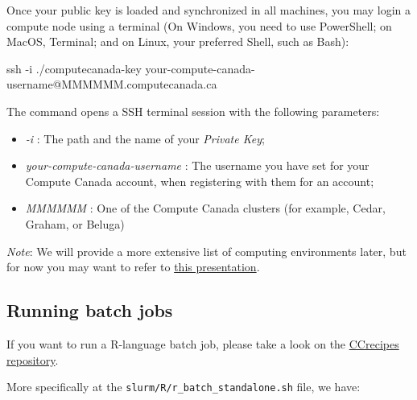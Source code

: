 \documentclass[
]{book}
\newenvironment{Shaded}{\begin{snugshade}}{\end{snugshade}}
\newcommand{\AttributeTok}[1]{\textcolor[rgb]{0.77,0.63,0.00}{#1}}
\newcommand{\FunctionTok}[1]{\textcolor[rgb]{0.00,0.00,0.00}{#1}}
\newcommand{\NormalTok}[1]{#1}
\providecommand{\tightlist}{%
  \setlength{\itemsep}{0pt}\setlength{\parskip}{0pt}}
\begin{document}
Once your public key is loaded and synchronized in all machines, you may login a compute node using a terminal (On Windows, you need to use PowerShell; on MacOS, Terminal; and on Linux, your preferred Shell, such as Bash):

\begin{Shaded}
\begin{Highlighting}[]
\FunctionTok{ssh} \AttributeTok{{-}i}\NormalTok{ ./computecanada{-}key your{-}compute{-}canada{-}username@MMMMMM.computecanada.ca}
\end{Highlighting}
\end{Shaded}

The command opens a SSH terminal session with the following parameters:

\begin{itemize}
\tightlist
\item
  \emph{-i} : The path and the name of your \emph{Private Key};
\item
  \emph{your-compute-canada-username} : The username you have set for your Compute Canada account, when registering with them for an account;
\item
  \emph{MMMMMM} : One of the Compute Canada clusters (for example, Cedar, Graham, or Beluga)
\end{itemize}

\emph{Note}: We will provide a more extensive list of computing environments later, but for now you may want to refer to \href{http://bit.ly/introhpc}{this presentation}.

\hypertarget{running-batch-jobs}{%
\subsection{Running batch jobs}\label{running-batch-jobs}}

If you want to run a R-language batch job, please take a look on the
\href{https://github.com/ricardobarroslourenco/CCrecipes}{CCrecipes repository}.

More specifically at the \texttt{slurm/R/r\_batch\_standalone.sh} file, we have:
\end{document}
